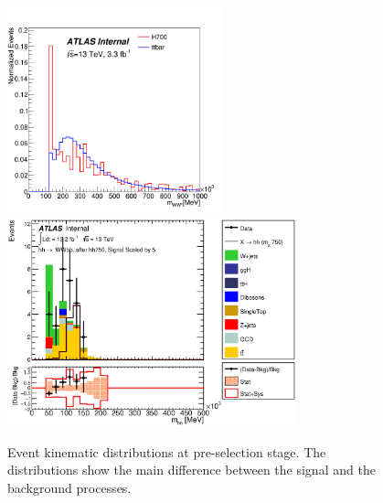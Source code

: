 \begin{figure}[!hb]
\begin{center}
		\includegraphics[height=60mm]{chapters/dihiggs/figures/Presel_WWMass.png} 
		\includegraphics[height=60mm]{chapters/dihiggs/figures/ControlPlots/CR1/C_opt700_bbpt150_drbb11_drww09_mww_hh750_bbMass.eps}
	\caption{Event  kinematic distributions at pre-selection stage. The
                 distributions show the main difference between the signal and
                 the background processes.}
	\label{fig:kin_presel}
	\end{center}    
\end{figure}
\fi

